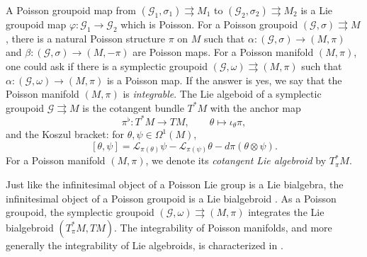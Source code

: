 \documentclass{amsart}
\newtheorem{example}[theorem]{Example}
\numberwithin{equation}{section}
\newcommand{\cG}{\mathcal{G}}
\newcommand{\cL}{\mathcal{L}}
\newcommand{\cO}{\mathcal{O}}
\newcommand{\rra}{\rightrightarrows}
\begin{document}
A Poisson groupoid map from $(\cG_1, \sigma_1) \rra M_1$ to $(\cG_2, \sigma_2) \rra M_2$ is a Lie groupoid map $\varphi: \cG_1 \to \cG_2$ which is Poisson.
For a Poisson groupoid $(\cG, \sigma) \rra M$, there is a natural Poisson structure $\pi$ on $M$ such that $\alpha: (\cG, \sigma) \to (M, \pi)$ and $\beta: (\cG, \sigma) \to (M, -\pi)$ are Poisson maps.
For a Poisson manifold $(M, \pi)$, one could ask if there is a symplectic groupoid $(\cG, \omega) \rra (M, \pi)$ such that $\alpha: (\cG, \omega) \to (M, \pi)$ is a Poisson map.
If the answer is yes, we say that the Poisson manifold $(M, \pi)$ is \emph{integrable}.
The Lie algeboid of a symplectic groupoid $\cG \rra M$ is the cotangent bundle $T^*M$ \cite{Wei87} with the anchor map
\[\pi^\flat: T^*M \to TM, \qquad \theta \mapsto \iota_\theta \pi,\]
and the Koszul bracket: for $\theta, \psi \in \Omega^1(M)$,
\[[\theta, \psi] = \cL_{\pi(\theta)} \psi - \cL_{\pi(\psi)} \theta - d\pi(\theta \otimes \psi).\]
For a Poisson manifold $(M, \pi)$, we denote its \emph{cotangent Lie algebroid} by $T^*_\pi M$.

Just like the infinitesimal object of a Poisson Lie group is a Lie bialgebra, the infinitesimal object of a Poisson groupoid is a Lie bialgebroid \cite{MX94}.
As a Poisson groupoid, the symplectic groupoid $(\cG, \omega) \rra (M, \pi)$ integrates the Lie bialgebroid $(T^*_\pi M, TM)$.
The integrability of Poisson manifolds, and more generally the integrability of Lie algebroids, is characterized in \cite{CF03, CF04}.

\end{document}
